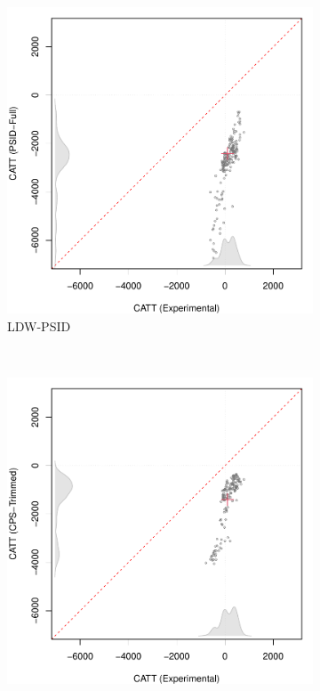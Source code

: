 \documentclass[letterpaper,12pt,leqno]{article}
\begin{document}
\begin{figure}[!ht]
\begin{minipage}[c]{1\textwidth}
\begin{subfigure}{0.4\linewidth}
            \includegraphics[width=\linewidth]{catt_placebo_PSID.pdf}
            \caption{LDW-PSID}
        \end{subfigure}\\
        \begin{subfigure}{0.4\linewidth}
            \includegraphics[width=\linewidth]{catt_placebo_cps_trim.pdf}

\end{subfigure}
\end{minipage}
\end{figure}
\end{document}
